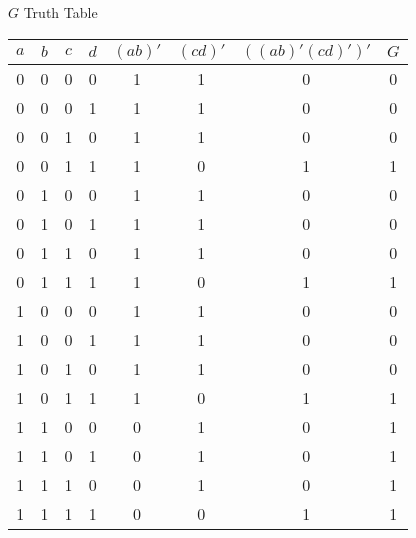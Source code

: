 \begin{multicols}{2}
\columnbreak
$G$ Truth Table\\
\begin{tabular}{|c|c|c|c|c|c|c|c|}
\hline
$a$ & $b$ & $c$ & $d$ & $(ab)'$ & $(cd)'$ & $((ab)'(cd)')'$ & $G$ \\ \hline
0   & 0   & 0   & 0   & 1       & 1       & 0               & 0   \\ \hline
0   & 0   & 0   & 1   & 1       & 1       & 0               & 0   \\ \hline
0   & 0   & 1   & 0   & 1       & 1       & 0               & 0   \\ \hline
0   & 0   & 1   & 1   & 1       & 0       & 1               & 1   \\ \hline
0   & 1   & 0   & 0   & 1       & 1       & 0               & 0   \\ \hline
0   & 1   & 0   & 1   & 1       & 1       & 0               & 0   \\ \hline
0   & 1   & 1   & 0   & 1       & 1       & 0               & 0   \\ \hline
0   & 1   & 1   & 1   & 1       & 0       & 1               & 1   \\ \hline
1   & 0   & 0   & 0   & 1       & 1       & 0               & 0   \\ \hline
1   & 0   & 0   & 1   & 1       & 1       & 0               & 0   \\ \hline
1   & 0   & 1   & 0   & 1       & 1       & 0               & 0   \\ \hline
1   & 0   & 1   & 1   & 1       & 0       & 1               & 1   \\ \hline
1   & 1   & 0   & 0   & 0       & 1       & 0               & 1   \\ \hline
1   & 1   & 0   & 1   & 0       & 1       & 0               & 1   \\ \hline
1   & 1   & 1   & 0   & 0       & 1       & 0               & 1   \\ \hline
1   & 1   & 1   & 1   & 0       & 0       & 1               & 1   \\ \hline
\end{tabular}
\end{multicols}

\clearpage
